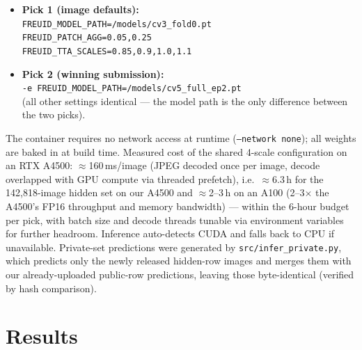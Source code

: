\documentclass[11pt,a4paper]{article}
\begin{document}
\begin{itemize}[noitemsep]
  \item \textbf{Pick 1 (image defaults):}\\
    \footnotesize\texttt{FREUID\_MODEL\_PATH=/models/cv3\_fold0.pt}\\
    \texttt{FREUID\_PATCH\_AGG=0.05,0.25}\\
    \texttt{FREUID\_TTA\_SCALES=0.85,0.9,1.0,1.1}\normalsize
  \item \textbf{Pick 2 (winning submission):}\\
    \footnotesize\texttt{-e FREUID\_MODEL\_PATH=/models/cv5\_full\_ep2.pt}\normalsize\\
    (all other settings identical --- the model path is the only difference
    between the two picks).
\end{itemize}

The container requires no network access at runtime (\texttt{--network none});
all weights are baked in at build time. Measured cost of the shared 4-scale
configuration on an RTX A4500: $\approx$160\,ms/image (JPEG decoded once per
image, decode overlapped with GPU compute via threaded prefetch), i.e.\
$\approx$6.3\,h for the 142{,}818-image hidden set on our A4500 and
$\approx$2--3\,h on an A100 (2--3$\times$ the A4500's FP16 throughput and
memory bandwidth) --- within the 6-hour budget per pick, with batch size and
decode threads tunable via environment variables for further headroom.
Inference auto-detects CUDA and falls back to CPU if unavailable. Private-set
predictions were generated by \texttt{src/infer\_private.py}, which predicts
only the newly released hidden-row images and merges them with our
already-uploaded public-row predictions, leaving those byte-identical (verified
by hash comparison).

\section{Results}
\label{sec:results}
\end{document}
